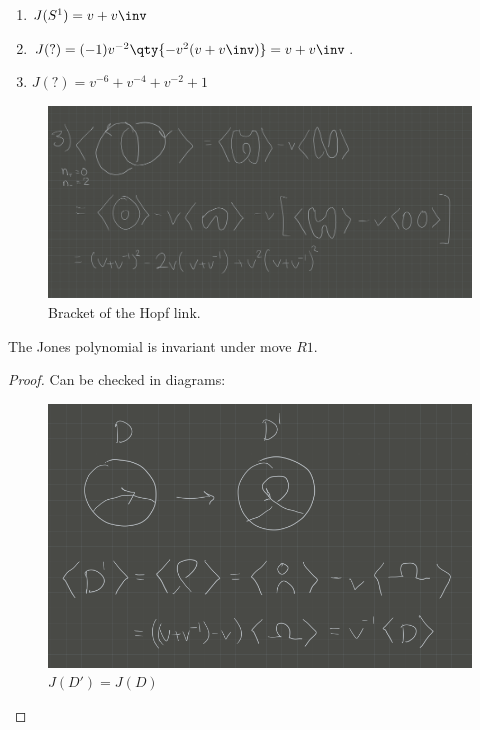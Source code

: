 \begin{example}

\hfill

\begin{enumerate}
\def\labelenumi{\arabic{enumi}.}
\item
  \(J(S^1) = v + v\inv\)
\item
  \(J(?) = (-1) v^{-2} \qty{ -v^2 (v+v\inv)} = v+v\inv\).
\item
  \(J(?) = v^{-6} + v^{-4} + v^{-2} + 1\)
\end{enumerate}

\begin{figure}
\centering
\includegraphics{figures/image_2020-07-06-11-50-40.png}
\caption{Bracket of the Hopf link.}
\end{figure}

\end{example}

\begin{proposition}

The Jones polynomial is invariant under move \(R1\).

\end{proposition}

\begin{proof}

Can be checked in diagrams:

\begin{figure}
\centering
\includegraphics[width=4.6875in,height=\textheight]{figures/image_2020-07-06-11-54-27.png}
\caption{\(J(D') = J(D)\)}
\end{figure}

\end{proof}

